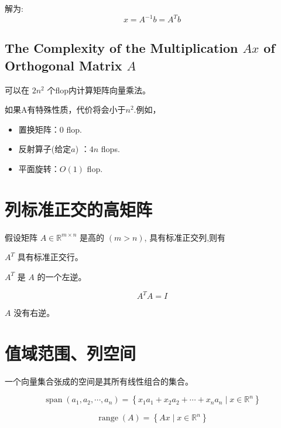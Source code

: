 解为:
$$
x=A^{-1} b=A^{T} b
$$


\subsection{The Complexity of the Multiplication $Ax$ of Orthogonal Matrix $A$}
可以在 $ 2  {n}^{2} $ 个flop内计算矩阵向量乘法。 

如果A有特殊性质，代价将会小于$n^2$.例如，

\begin{itemize}
    \item 置换矩阵：$0$ flop.
    \item 反射算子(给定$a$) ：$4n$ flops.
    \item 平面旋转：$O(1)$ flop.
\end{itemize}

\section{列标准正交的高矩阵}

\begin{theorem}
    假设矩阵 $ A \in \mathbb{R}^{m \times n} $ 是高的 $ ({m}>{n}) $, 具有标准正交列,则有

    $ A^{T} $ 具有标准正交行。
\end{theorem}

\begin{theorem}
    $ A^{T} $ 是 $ A $ 的一个左逆。

    $$A^T A =I$$
\end{theorem}

\begin{theorem}
    $ A $ 没有右逆。
\end{theorem}

\section{值域范围、列空间}

\begin{definition}[向量集合张成的空间]
    一个向量集合张成的空间是其所有线性组合的集合。

    $$ \operatorname{span}\left(a_{1}, a_{2}, \cdots, a_{n}\right)=\left\{x_{1} a_{1}+x_{2} a_{2}+\cdots+x_{n} a_{n} \mid x \in \mathbb{R}^{n}\right\} $$
\end{definition}

\begin{definition}
    $$ \operatorname{range}(A)=\left\{A x \mid x \in \mathbb{R}^{n}\right\} $$
\end{definition}

